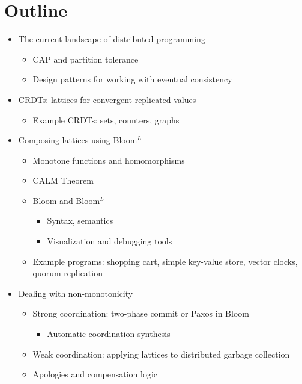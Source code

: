 \documentclass{sig-alternate}
\def\blooml{Bloom$^L$\xspace}
\begin{document}
\section{Outline}

\begin{itemize}
\item
  The current landscape of distributed programming
  \begin{itemize}
  \item
    CAP and partition tolerance~\cite{Brewer2012,Brewer2000}
  \item
    Design patterns for working with eventual consistency
  \end{itemize}
\item
  CRDTs: lattices for convergent replicated values
  \begin{itemize}
  \item
    Example CRDTs: sets, counters, graphs
  \end{itemize}
\item
  Composing lattices using \blooml
  \begin{itemize}
  \item
    Monotone functions and homomorphisms
  \item
    CALM Theorem
  \item
    Bloom and \blooml
    \begin{itemize}
    \item
      Syntax, semantics
    \item
      Visualization and debugging tools
    \end{itemize}
  \item
    Example programs: shopping cart, simple key-value store, vector clocks,
    quorum replication
  \end{itemize}
\item
  Dealing with non-monotonicity
  \begin{itemize}
  \item
    Strong coordination: two-phase commit or Paxos in Bloom
    \begin{itemize}
    \item
      Automatic coordination synthesis
    \end{itemize}
  \item
    Weak coordination: applying lattices to distributed garbage collection
  \item
    Apologies and compensation logic~\cite{Garcia-Molina1987,Helland2009,Korth1990}
  \end{itemize}

\end{itemize}
\end{document}
